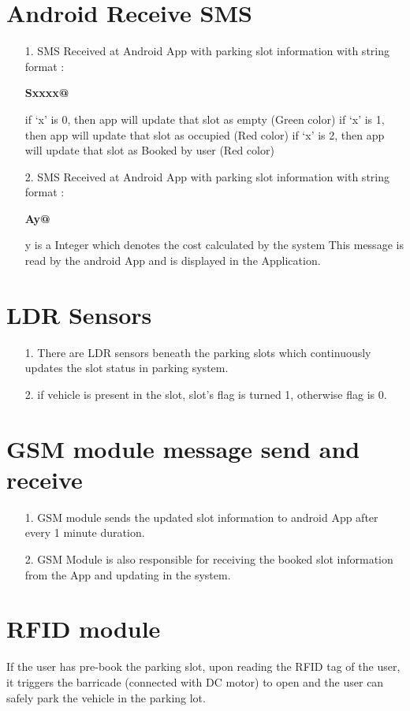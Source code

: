 \documentclass[12pt,a4paper]{report}
\begin{document}
\section{Android Receive SMS}
\begin{itemize}
	\item [1.] SMS Received at Android App with parking slot information with string format :  
	\begin{center}
		\textbf{Sxxxx@}
	\end{center}
		if ‘x’ is 0, then app will update that slot as empty (Green color) 
	if ‘x’ is 1, then app will update that slot as occupied (Red color) 
	if ‘x’ is 2, then app will update that slot as Booked by user (Red color)
	\item [2.]SMS Received at Android App with parking slot information with string format : 
	\begin{center}
		\textbf{Ay@}
	\end{center}
	y is a Integer which denotes the cost calculated by the system
	This message is read by the android App and is displayed in the Application.
\end{itemize}
\section{LDR Sensors}
\begin{itemize}
	\item [1.] There are LDR sensors beneath the parking slots which continuously updates the  slot status in parking system.
	\item [2.] if vehicle is present in the slot, slot’s flag is turned 1, otherwise flag is 0.
\end{itemize}
\section{GSM module message send and receive}
\begin{itemize}
	\item [1.] GSM module sends the updated slot information to android App after every 1 minute duration.
	\item [2.] GSM Module is also responsible for receiving the booked slot information from the App and updating in the system.
\end{itemize}
\section{RFID module}
If the user has pre-book the parking slot, upon reading the RFID tag of the user, it triggers the barricade (connected with DC motor) to open and the user can safely park the vehicle in the parking lot.
\end{document}
